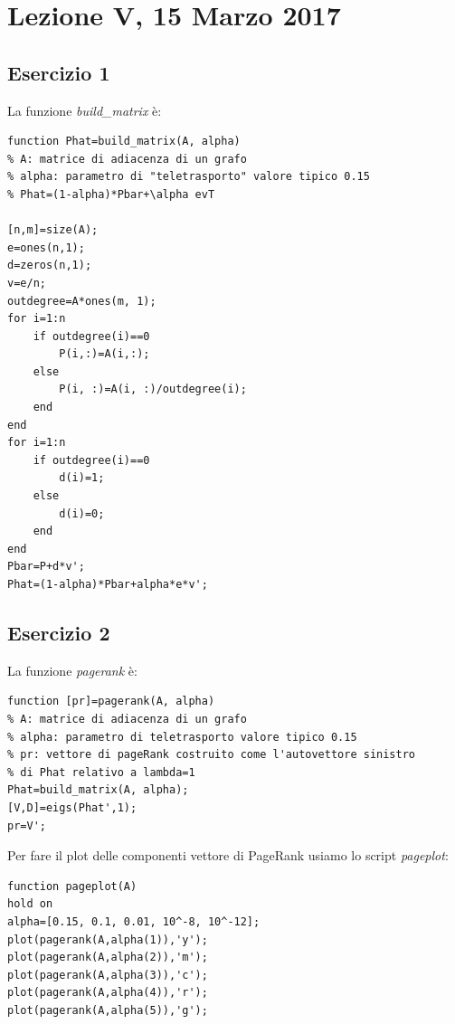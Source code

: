 \documentclass[11pt,a4paper,twoside,openright,titlepage,
                           headinclude,footinclude,BCOR5mm,
                           numbers=noenddot,cleardoublepage=empty,
                           tablecaptionabove]{scrbook}
\begin{document}

\chapter{Lezione V, 15 Marzo 2017}
\section{Esercizio 1}
La funzione \emph{build\_matrix} è:
\begin{lstlisting}[frame=trBL]
function Phat=build_matrix(A, alpha)
% A: matrice di adiacenza di un grafo
% alpha: parametro di "teletrasporto" valore tipico 0.15
% Phat=(1-alpha)*Pbar+\alpha evT

[n,m]=size(A);
e=ones(n,1);
d=zeros(n,1);
v=e/n;
outdegree=A*ones(m, 1);
for i=1:n
    if outdegree(i)==0
        P(i,:)=A(i,:);
    else
        P(i, :)=A(i, :)/outdegree(i);
    end
end
for i=1:n
    if outdegree(i)==0
        d(i)=1;
    else
        d(i)=0;
    end
end
Pbar=P+d*v';
Phat=(1-alpha)*Pbar+alpha*e*v';
\end{lstlisting}
\section{Esercizio 2}
La funzione \emph{pagerank} è:
\begin{lstlisting}[frame=trBL]
function [pr]=pagerank(A, alpha)
% A: matrice di adiacenza di un grafo
% alpha: parametro di teletrasporto valore tipico 0.15
% pr: vettore di pageRank costruito come l'autovettore sinistro
% di Phat relativo a lambda=1
Phat=build_matrix(A, alpha);
[V,D]=eigs(Phat',1);
pr=V';
\end{lstlisting}
Per fare il plot delle componenti vettore di PageRank usiamo lo script \emph{pageplot}:
\begin{lstlisting}[frame=trBL]
function pageplot(A)
hold on
alpha=[0.15, 0.1, 0.01, 10^-8, 10^-12];
plot(pagerank(A,alpha(1)),'y');
plot(pagerank(A,alpha(2)),'m');
plot(pagerank(A,alpha(3)),'c');
plot(pagerank(A,alpha(4)),'r');
plot(pagerank(A,alpha(5)),'g');
\end{lstlisting}
\end{document}
